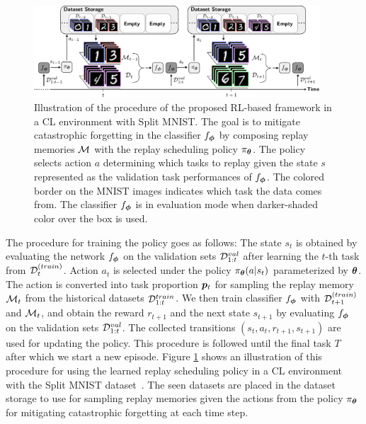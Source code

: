 \begin{figure}[t]
	\centering
	\includegraphics[width=0.95\textwidth]{Chapter1/figures/testing_size2.pdf}
	\caption{Illustration of the procedure of the proposed RL-based framework in a CL environment with Split MNIST. The goal is to mitigate catastrophic forgetting in the classifier $f_{{\bm{\phi}}}$ by composing replay memories ${\mathcal{M}}$ with the replay scheduling policy $\pi_{{\bm{\theta}}}$. The policy selects action $a$ determining which tasks to replay given the state $s$ represented as the validation task performances of $f_{{\bm{\phi}}}$. The colored border on the MNIST images indicates which task the data comes from. The classifier $f_{{\bm{\phi}}}$ is in evaluation mode when darker-shaded color over the box is used. %
	}
	\label{fig:rl_framework_pipeline}
	\vspace{-2mm}
\end{figure}

The procedure for training the policy goes as follows: 
The state $s_{t}$ is obtained by evaluating the network $f_{{\bm{\phi}}}$ on the validation sets ${\mathcal{D}}_{1:t}^{val}$ after learning the $t$-th task from ${\mathcal{D}}_t^{(train)}$. Action $a_{t}$ is selected under the policy $\pi_{{\bm{\theta}}}(a | s_{t})$ parameterized by ${\bm{\theta}}$. The action is converted into task proportion ${\bm{p}}_t$ for sampling the replay memory ${\mathcal{M}}_{t}$ from the historical datasets ${\mathcal{D}}_{1:t}^{train}$. 
We then train classifier $f_{{\bm{\phi}}}$ with ${\mathcal{D}}_{t+1}^{(train)}$ and ${\mathcal{M}}_{t}$, and obtain the reward $r_{t+1}$ and the next state $s_{t+1}$ by evaluating $f_{{\bm{\phi}}}$ on the validation sets ${\mathcal{D}}_{1:t}^{val}$. The collected transitions $(s_t, a_t, r_{t+1}, s_{t+1})$ are used for updating the policy. This procedure is followed until the final task $T$ after which we start a new episode. %
Figure \ref{fig:rl_framework_pipeline} shows an illustration of this procedure for using the learned replay scheduling policy in a CL environment with the Split MNIST dataset~. The seen datasets are placed in the dataset storage to use for sampling replay memories given the actions from the policy $\pi_{{\bm{\theta}}}$ for mitigating catastrophic forgetting at each time step.

